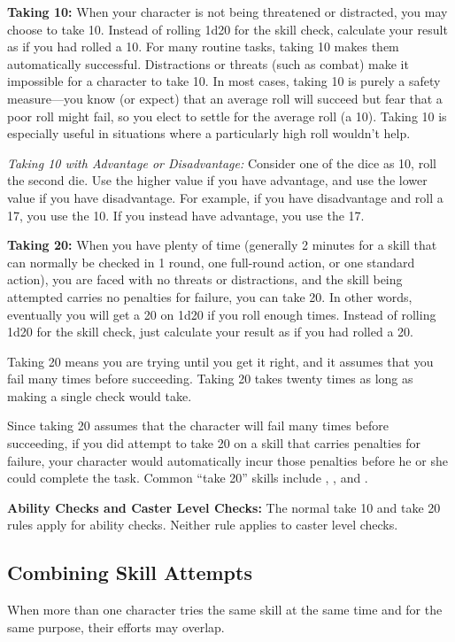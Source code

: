 \textbf{Taking 10:} When your character is not being threatened or distracted, you may choose to take 10. Instead of rolling 1d20 for the skill check, calculate your result as if you had rolled a 10. For many routine tasks, taking 10 makes them automatically successful. Distractions or threats (such as combat) make it impossible for a character to take 10. In most cases, taking 10 is purely a safety measure---you know (or expect) that an average roll will succeed but fear that a poor roll might fail, so you elect to settle for the average roll (a 10). Taking 10 is especially useful in situations where a particularly high roll wouldn't help.

\textit{Taking 10 with Advantage or Disadvantage:} Consider one of the dice as 10, roll the second die. Use the higher value if you have advantage, and use the lower value if you have disadvantage. For example, if you have disadvantage and roll a 17, you use the 10. If you instead have advantage, you use the 17.

\textbf{Taking 20:} When you have plenty of time (generally 2 minutes for a skill that can normally be checked in 1 round, one full-round action, or one standard action), you are faced with no threats or distractions, and the skill being attempted carries no penalties for failure, you can take 20. In other words, eventually you will get a 20 on 1d20 if you roll enough times. Instead of rolling 1d20 for the skill check, just calculate your result as if you had rolled a 20.

Taking 20 means you are trying until you get it right, and it assumes that you fail many times before succeeding. Taking 20 takes twenty times as long as making a single check would take.

Since taking 20 assumes that the character will fail many times before succeeding, if you did attempt to take 20 on a skill that carries penalties for failure, your character would automatically incur those penalties before he or she could complete the task. Common ``take 20'' skills include , , and .

\textbf{Ability Checks and Caster Level Checks:} The normal take 10 and take 20 rules apply for ability checks. Neither rule applies to caster level checks.

\subsection{Combining Skill Attempts}
When more than one character tries the same skill at the same time and for the same purpose, their efforts may overlap.

